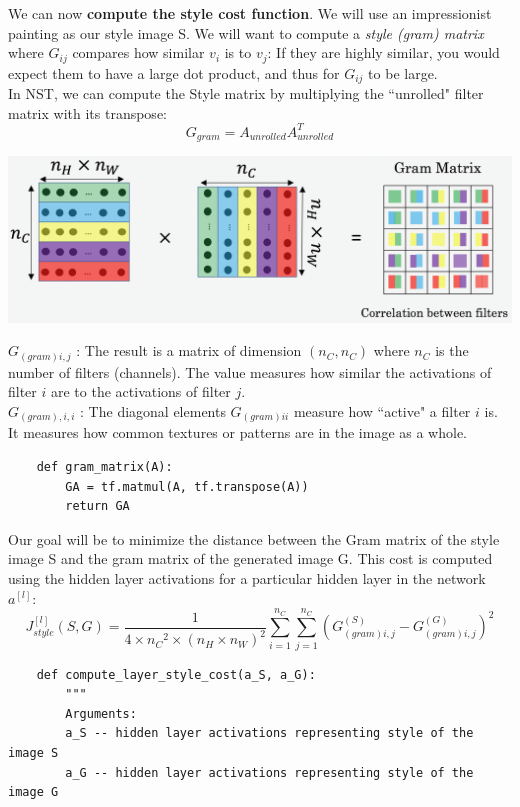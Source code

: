 \documentclass[11pt, a4paper]{article}
\begin{document}
\begin{spacing}{1.1}
	\noindent We can now \textbf{compute the style cost function}. We will use an impressionist painting as our style image S. We will want to compute a \textit{style (gram) matrix} where $G_{ij}$ compares how similar $v_i$ is to $v_j$: If they are highly similar, you would expect them to have a large dot product, and thus for $G_{ij}$ to be large.\vspace*{1mm}\\
	In NST, we can compute the Style matrix by multiplying the ``unrolled" filter matrix with its transpose:
	$$ G_{gram} = A_{unrolled}A_{unrolled}^T $$
	\begin{center} \includegraphics[scale=0.25]{gm}	\end{center}
	$G_{(gram)i,j}$ : The result is a matrix of dimension $(n_C,n_C)$ where $n_C$ is the number of filters (channels). The value measures how similar the activations of filter $i$ are to the activations of filter $j$. \vspace*{1mm}\\
	$G_{(gram),i,i}$ : The diagonal elements $G_{(gram)ii}$ measure how ``active" a filter $i$ is. It measures how common textures or patterns are in the image as a whole.
	\begin{lstlisting}
	def gram_matrix(A):
		GA = tf.matmul(A, tf.transpose(A))
		return GA	\end{lstlisting} \vspace*{1mm}
	Our goal will be to minimize the distance between the Gram matrix of the style image S and the gram matrix of the generated image G. This cost is computed using the hidden layer activations for a particular hidden layer in the network $a^{[l]}$:
	$$J_{style}^{[l]}(S,G) = \frac{1}{4 \times {n_C}^2 \times (n_H \times n_W)^2} \sum _{i=1}^{n_C}\sum_{j=1}^{n_C}(G^{(S)}_{(gram)i,j} - G^{(G)}_{(gram)i,j})^2$$
	\begin{lstlisting}
	def compute_layer_style_cost(a_S, a_G):
		"""
		Arguments:
		a_S -- hidden layer activations representing style of the image S 
		a_G -- hidden layer activations representing style of the image G
		

\end{lstlisting}
\end{spacing}
\end{document}
